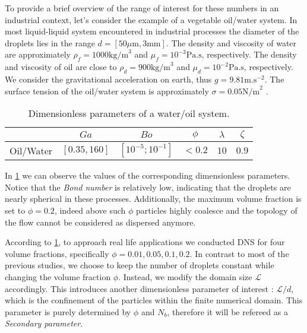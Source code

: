 To provide a brief overview of the range of interest for these numbers in an industrial context, let's consider the example of a vegetable oil/water system.
In most liquid-liquid system encountered in industrial processes the diameter of the droplets lies in the range $d = [50 \mu \text{m}, 3 \text{mm}]$.
The density and viscosity of water are approximately $\rho_f = 1000 \text{kg/m}^3$ and $\mu_f = 10^{-3} \text{Pa.s}$, respectively.
The density and viscosity of oil are close to $\rho_d = 900 \text{kg/m}^3$ and $\mu_d = 10^{-2} \text{Pa.s}$, respectively.
We consider the gravitational acceleration on earth, thus $g= 9.81 \text{m.s}^{-2}$.
The surface tension of the oil/water system is approximately $\sigma = 0.05 \text{N/m}^2$ \citep{de2015gouttes}. 
\begin{table}[h!]
    \centering
    \caption{Dimensionless parameters of a water/oil system.}
    \begin{tabular}{|c||c|c|c|c|c|}
        \hline&$Ga$&$Bo$&$\phi$&$\lambda$&$\zeta$\\ \hline
        \hline Oil/Water&$[0.35,160]$&$[10^{-5};10^{-1}]$&$<0.2$&$10$&$0.9$\\ \hline
    \end{tabular}
    \label{tab:parameters_exp}
\end{table}
In \ref{tab:parameters_exp} we can observe the values of the corresponding dimensionless parameters.  
Notice that the \textit{Bond number} is relatively low, indicating that the droplets are nearly spherical in these processes.
Additionally, the maximum volume fraction is set to $\phi = 0.2$, indeed above such $\phi$ particles highly coalesce and the topology of the flow cannot be considered as dispersed anymore. 


According to \ref{tab:parameters_exp}, to approach real life applications we conducted DNS for four volume fractions, specifically $\phi = 0.01,0.05,0.1,0.2$.
In contrast to most of the previous studies, we choose to keep the number of droplets constant while changing the volume fraction $\phi$. 
Instead, we modify the domain size $\mathcal{L}$ accordingly. 
This introduces another dimensionless parameter of interest : $\mathcal{L}/d$, which is the confinement of the particles within the finite numerical domain. 
This parameter is purely determined by $\phi$ and $N_b$, therefore it will be refereed as a \textit{Secondary parameter}.

